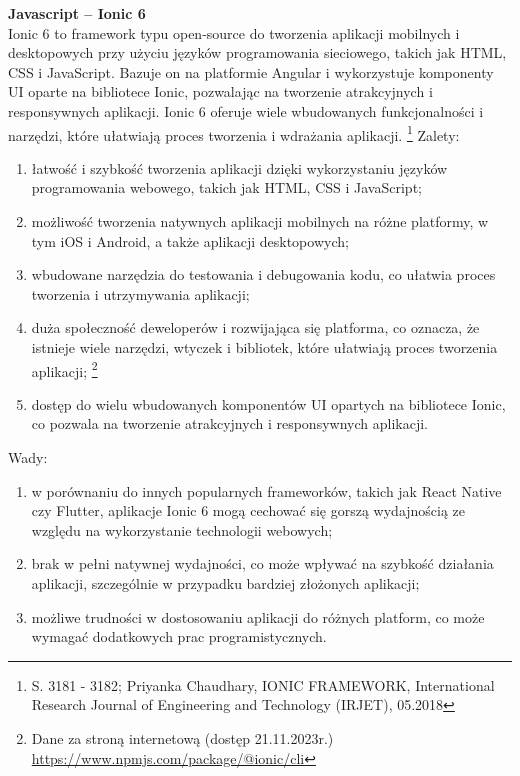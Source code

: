 \documentclass[12pt, a4paper, twoside, openany]{book}
\newcommand{\forceindent}{\leavevmode{\parindent=1.3em\indent}}
\begin{document}
\forceindent \textbf{Javascript -- Ionic 6\\}
\indent Ionic 6 to framework typu open-source do tworzenia aplikacji mobilnych i desktopowych przy użyciu języków programowania sieciowego, takich jak HTML, CSS i JavaScript. Bazuje on na platformie Angular i wykorzystuje komponenty UI oparte na bibliotece Ionic, pozwalając na tworzenie atrakcyjnych i responsywnych aplikacji. Ionic 6 oferuje wiele wbudowanych funkcjonalności i narzędzi, które ułatwiają proces tworzenia i wdrażania aplikacji. \footnote{S. 3181 - 3182; Priyanka Chaudhary, IONIC FRAMEWORK, International Research Journal of Engineering and Technology (IRJET), 05.2018}
Zalety:
\begin{enumerate}[label=--]
    \item łatwość i szybkość tworzenia aplikacji dzięki wykorzystaniu języków programowania webowego, takich jak HTML, CSS i JavaScript;
    \item możliwość tworzenia natywnych aplikacji mobilnych na różne platformy, w tym iOS i Android, a także aplikacji desktopowych;
    \item wbudowane narzędzia do testowania i debugowania kodu, co ułatwia proces tworzenia i utrzymywania aplikacji;
    \item duża społeczność deweloperów i rozwijająca się platforma, co oznacza, że istnieje wiele narzędzi, wtyczek i bibliotek, które ułatwiają proces tworzenia aplikacji; \footnote{Dane za stroną internetową (dostęp 21.11.2023r.) \url{https://www.npmjs.com/package/@ionic/cli}}
    \item dostęp do wielu wbudowanych komponentów UI opartych na bibliotece Ionic, co pozwala na tworzenie atrakcyjnych i responsywnych aplikacji.
\end{enumerate}

Wady:
\begin{enumerate}[label=--]
    \item w porównaniu do innych popularnych frameworków, takich jak React Native czy Flutter, aplikacje Ionic 6 mogą cechować się gorszą wydajnością ze względu na wykorzystanie technologii webowych;
    \item brak w pełni natywnej wydajności, co może wpływać na szybkość działania aplikacji, szczególnie w przypadku bardziej złożonych aplikacji;
    \item możliwe trudności w dostosowaniu aplikacji do różnych platform, co może wymagać dodatkowych prac programistycznych.
\end{enumerate}
\end{document}
